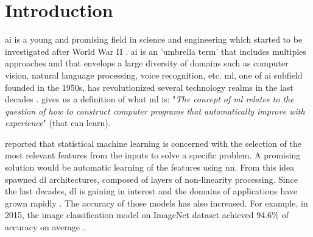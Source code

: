 \chapter{Introduction} \label{chap:intr}
%
%
\acrfull{ai} is a young and promising field in science and engineering which started to be investigated after World War II \cite{russell_artificial_2009}. \acrshort{ai} is an 'umbrella term' that includes multiples approaches and that envelops a large diversity of domains such as computer vision, natural language processing, voice recognition, etc.
\acrfull{ml}, one of \acrshort{ai} subfield founded in the 1950s, has revolutionized several technology realms in the last decades \cite{alom_history_2018}. \textcite{mitchell_machine_1997} gives us a definition of what \acrshort{ml} is: "\textit{The concept of \acrshort{ml} relates to the question of how to construct computer programs that automatically improve with experience}" (that can learn).

\textcite{arnold_introduction_2011} reported that statistical machine learning is concerned with the selection of the most relevant features from the inputs to solve a specific problem. A promising solution would be automatic learning of the features using \acrfull{nn}. From this idea spawned \acrfull{dl} architectures, composed of layers of non-linearity processing. Since the last decades, \acrshort{dl} is gaining in interest and the domains of applications have grown rapidly \cite{wason_deep_2018}. The accuracy of those models has also increased. For example, in 2015, the image classification model on ImageNet dataset achieved 94.6\% of accuracy on average \cite{russakovsky_imagenet_2015}.

